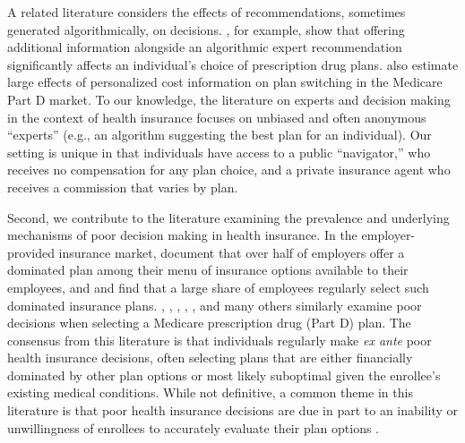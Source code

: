 \documentclass[12pt]{article}
\begin{document}
A related literature considers the effects of recommendations, sometimes generated algorithmically, on decisions. \cite{bundorf2024}, for example, show that offering additional information alongside an algorithmic expert recommendation significantly affects an individual's choice of prescription drug plans. \cite{kling2012} also estimate large effects of personalized cost information on plan switching in the Medicare Part D market. To our knowledge, the literature on experts and decision making in the context of health insurance focuses on unbiased and often anonymous ``experts'' (e.g., an algorithm suggesting the best plan for an individual). Our setting is unique in that individuals have access to a public ``navigator,'' who receives no compensation for any plan choice, and a private insurance agent who receives a commission that varies by plan.

Second, we contribute to the literature examining the prevalence and underlying mechanisms of poor decision making in health insurance. In the employer-provided insurance market, \cite{liu2021} document that over half of employers offer a dominated plan among their menu of insurance options available to their employees, and \cite{sinaiko2011} and \cite{bhargava2017} find that a large share of employees regularly select such dominated insurance plans. \cite{abaluck2011}, \cite{ketcham2012}, \cite{zhou2012}, \cite{heiss2013}, \cite{gruber2017}, \cite{ho2017rand} and many others similarly examine poor decisions when selecting a Medicare prescription drug (Part D) plan. The consensus from this literature is that individuals regularly make \textit{ex ante} poor health insurance decisions, often selecting plans that are either financially dominated by other plan options or most likely suboptimal given the enrollee's existing medical conditions. While not definitive, a common theme in this literature is that poor health insurance decisions are due in part to an inability or unwillingness of enrollees to accurately evaluate their plan options \citep{bhargava2017, hanoch2009}.
\end{document}
